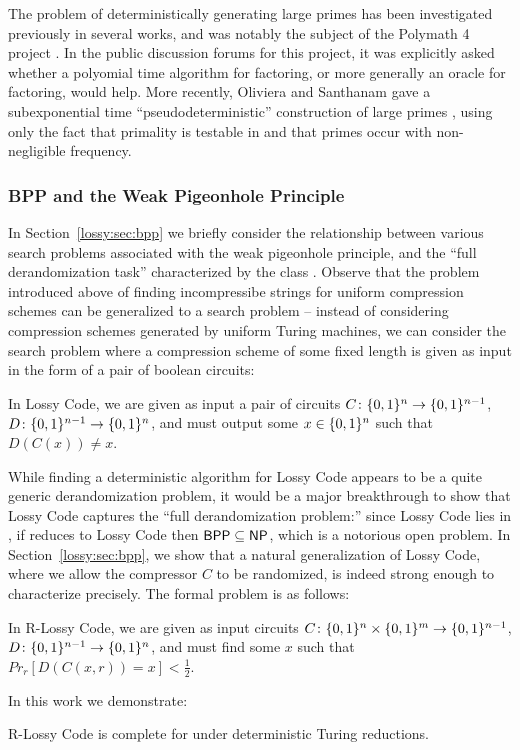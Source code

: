 The problem of deterministically generating large primes has been investigated previously in several works, and was notably the subject of the Polymath 4 project \cite{polymath}. In the public discussion forums for this project, it was explicitly asked whether a polyomial time algorithm for factoring, or more generally an oracle for factoring, would help. More recently, Oliviera and Santhanam gave a subexponential time ``pseudodeterministic'' construction of large primes \cite{pseudo-primes}, using only the fact that primality is testable in  \cite{primes} and that primes occur with non-negligible frequency.

\subsubsection{BPP and the Weak Pigeonhole Principle}
In Section~\ref{lossy:sec:bpp} we briefly consider the relationship between various search problems associated with the weak pigeonhole principle, and the ``full derandomization task'' characterized by the class . Observe that the problem introduced above of finding incompressibe strings for uniform compression schemes can be generalized to a  search problem -- instead of considering compression schemes generated by uniform Turing machines, we can consider the search problem where a compression scheme of some fixed length is given as input in the form of a pair of boolean circuits:
\begin{definition}
In {\sc Lossy Code}, we are given as input a pair of circuits $C\colon \{0,1\}^n \to \{0,1\}^{n-1}$, $D\colon\{0,1\}^{n-1}\to\{0,1\}^n$, and must output some $x \in \{0,1\}^n$ such that $D(C(x))\neq x$.
\end{definition}

While finding a deterministic algorithm for {\sc Lossy Code} appears to be a quite generic derandomization problem, it would be a major breakthrough to show that {\sc Lossy Code} captures the ``full derandomization problem:'' since {\sc Lossy Code} lies in , if  reduces to {\sc Lossy Code} then $\cl{BPP} \subseteq \cl{NP}$, which is a notorious open problem. In Section~\ref{lossy:sec:bpp}, we show that a natural generalization of {\sc Lossy Code}, where we allow the compressor $C$ to be randomized, is indeed strong enough to characterize  precisely. The formal problem is as follows:
\begin{definition}
In {\sc R-Lossy Code}, we are given as input circuits $C\colon \{0,1\}^n \times \{0,1\}^m \to \{0,1\}^{n-1}$, $D\colon \{0,1\}^{n-1}\to\{0,1\}^n$, and must find some $x$ such that $Pr_r [D(C(x,r))=x] < \frac{1}{2}$. 
\end{definition}
In this work we demonstrate:
\begin{theorem*}
{\sc R-Lossy Code} is complete for  under deterministic Turing reductions.
\end{theorem*}

